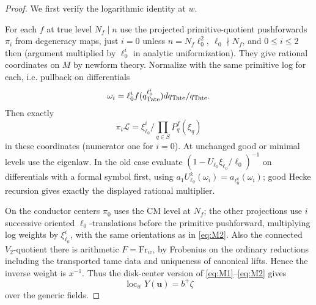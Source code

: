 \begin{proof}
We first verify the logarithmic identity at \(w\).

For each \(f\) at true level \(N_f\mid n\) use the projected primitive-quotient pushforwards \(\pi_i\) from degeneracy maps, just \(i=0\) unless \(n=N_f\ell_0^2,\ \ell_0\nmid N_f\), and \(0\le i\le2\) then (argument multiplied by \(\ell_0^i\) in analytic uniformization). They give rational coordinates on \(M\) by newform theory. Normalize with the same primitive log for each, i.e. pullback on differentials
\[
                  \omega_i=\ell_0^i f(q_{\rm Tate}^{\ell_0^i})
                                          dq_{\rm Tate}/q_{\rm Tate}.
\]
Then exactly
\[
                 \pi_i\mathcal L=\xi_{\ell_0}^i\Big/
                                         \prod_{q\in S}P_q^f(\xi_q)
\]
in these coordinates (numerator one for \(i=0\)). At unchanged good or minimal levels use the eigenlaw. In the old case evaluate \((1-U_{\ell_0}\xi_{\ell_0}/\ell_0)^{-1}\) on differentials with a formal symbol first, using \(a_1 U_{\ell_0}^k(\omega_i)=a_{\ell_0^k}(\omega_i)\); good Hecke recursion gives exactly the displayed rational multiplier.

On the conductor centers \(\pi_0\) uses the CM level at \(N_f\); the other projections use \(i\) successive oriented \(\ell_0\)-translations before the primitive pushforward, multiplying log weights by \(\xi_{\ell_0}^i\), with the same orientations as in \eqref{eq:M2}. Also the connected \(V_2\)-quotient there is arithmetic \(F=\mathrm{Fr}_w\), by Frobenius on the ordinary reductions including the transported tame data and uniqueness of canonical lifts. Hence the inverse weight is \(x^{-1}\). Thus the disk-center version of \eqref{eq:M1}--\eqref{eq:M2} gives
\[
                          \operatorname{loc}_wY(\mathbf u)=b^+\zeta
\]
over the generic fields.


\end{proof}
